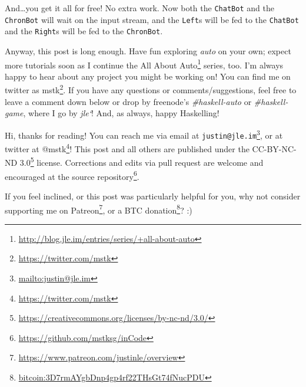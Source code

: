\documentclass[]{article}
\renewcommand{\href}[2]{#2\footnote{\url{#1}}}
\begin{document}
And\ldots{}you get it all for free! No extra work. Now both the \texttt{ChatBot}
and the \texttt{ChronBot} will wait on the input stream, and the \texttt{Left}s
will be fed to the \texttt{ChatBot} and the \texttt{Right}s will be fed to the
\texttt{ChronBot}.

Anyway, this post is long enough. Have fun exploring \emph{auto} on your own;
expect more tutorials soon as I continue the
\href{http://blog.jle.im/entries/series/+all-about-auto}{All About Auto} series,
too. I'm always happy to hear about any project you might be working on! You can
find me on twitter as \href{https://twitter.com/mstk}{mstk}. If you have any
questions or comments/suggestions, feel free to leave a comment down below or
drop by freenode's \emph{\#haskell-auto} or \emph{\#haskell-game}, where I go by
\emph{jle`}! And, as always, happy Haskelling!

Hi, thanks for reading! You can reach me via email at
\href{mailto:justin@jle.im}{\nolinkurl{justin@jle.im}}, or at twitter at
\href{https://twitter.com/mstk}{@mstk}! This post and all others are published
under the \href{https://creativecommons.org/licenses/by-nc-nd/3.0/}{CC-BY-NC-ND
3.0} license. Corrections and edits via pull request are welcome and encouraged
at \href{https://github.com/mstksg/inCode}{the source repository}.

If you feel inclined, or this post was particularly helpful for you, why not
consider \href{https://www.patreon.com/justinle/overview}{supporting me on
Patreon}, or a \href{bitcoin:3D7rmAYgbDnp4gp4rf22THsGt74fNucPDU}{BTC donation}?
:)
\end{document}
